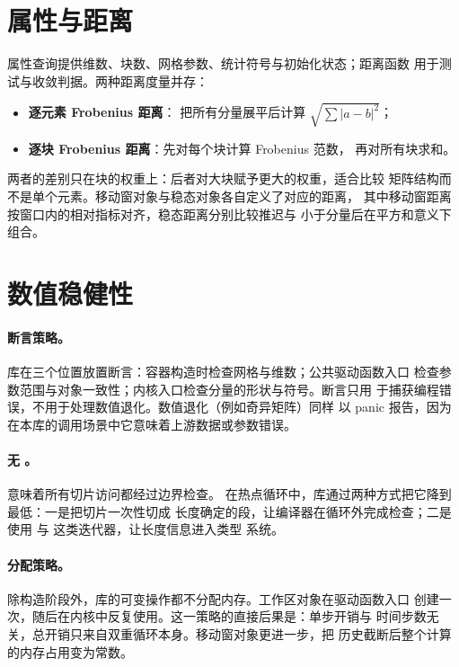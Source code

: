\section{属性与距离}
\label{sec:properties}

属性查询提供维数、块数、网格参数、统计符号与初始化状态；距离函数
用于测试与收敛判据。两种距离度量并存：
\begin{itemize}
    \item \textbf{逐元素 Frobenius 距离}：
          把所有分量展平后计算 $\sqrt{\sum|a-b|^2}$；
    \item \textbf{逐块 Frobenius 距离}：先对每个块计算 Frobenius 范数，
          再对所有块求和。
\end{itemize}
两者的差别只在块的权重上：后者对大块赋予更大的权重，适合比较
矩阵结构而不是单个元素。移动窗对象与稳态对象各自定义了对应的距离，
其中移动窗距离按窗口内的相对指标对齐，稳态距离分别比较推迟与
小于分量后在平方和意义下组合。

\section{数值稳健性}
\label{sec:robustness}

\paragraph{断言策略。}
库在三个位置放置断言：容器构造时检查网格与维数；公共驱动函数入口
检查参数范围与对象一致性；内核入口检查分量的形状与符号。断言只用
于捕获编程错误，不用于处理数值退化。数值退化（例如奇异矩阵）同样
以 panic 报告，因为在本库的调用场景中它意味着上游数据或参数错误。

\paragraph{无 。}
 意味着所有切片访问都经过边界检查。
在热点循环中，库通过两种方式把它降到最低：一是把切片一次性切成
长度确定的段，让编译器在循环外完成检查；二是使用
 与  这类迭代器，让长度信息进入类型
系统。

\paragraph{分配策略。}
除构造阶段外，库的可变操作都不分配内存。工作区对象在驱动函数入口
创建一次，随后在内核中反复使用。这一策略的直接后果是：单步开销与
时间步数无关，总开销只来自双重循环本身。移动窗对象更进一步，把
历史截断后整个计算的内存占用变为常数。
